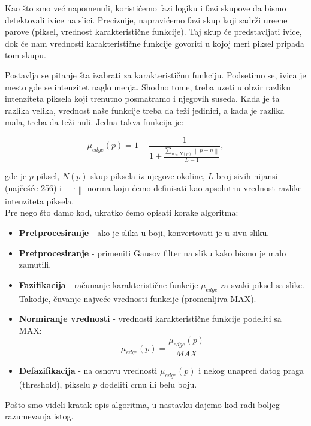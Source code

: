 \documentclass[12pt,a4paper]{article}
\theoremstyle{definition}
\theoremstyle{remark}
\theoremstyle{plain}
\begin{document}
Kao \v sto smo ve\' c napomenuli, koristi\' cemo fazi logiku i fazi skupove da bismo detektovali ivice na slici. Preciznije, napravi\' cemo fazi skup koji sadr\v zi ure\dj ene parove (piksel, vrednost karakteristi\v cne funkcije). Taj skup \' ce predstavljati ivice, dok \' ce nam vrednosti karakteristi\v cne funkcije govoriti u kojoj meri piksel pripada tom skupu.

Postavlja se pitanje \v sta izabrati za karakteristi\v cnu funkciju. Podsetimo se, ivica je mesto gde se intenzitet naglo menja. Shodno tome, treba uzeti u obzir razliku intenziteta piksela koji trenutno posmatramo i njegovih suseda. Kada je ta razlika velika, vrednost na\v se funkcije treba da te\v zi jedinici, a kada je razlika mala, treba da te\v zi nuli. Jedna takva funkcija je:

\begin{equation}
  \mu_{edge}(p) = 1 - \frac{1}{1+\frac{\sum_{n\in N(p)}\left\|p-n\right\|}{L-1}},
\end{equation}

gde je $p$ piksel, $N(p)$ skup piksela iz njegove okoline, $L$ broj sivih nijansi (naj\v ce\v s\' ce 256) i $\left\| \cdot \right\|$ norma koju \' cemo definisati kao apsolutnu vrednost razlike intenziteta piksela.\\

Pre nego \v sto damo kod, ukratko \' cemo opisati korake algoritma:
\begin{itemize}
  \item \textbf{Pretprocesiranje} - ako je slika u boji, konvertovati je u sivu sliku.
  \item \textbf{Pretprocesiranje} - primeniti Gausov filter na sliku kako bismo je malo zamutili.
  \item \textbf{Fazifikacija} - ra\v cunanje karakteristi\v cne funkcije $\mu_{edge}$ za svaki piksel sa slike. Takodje, \v cuvanje najve\' ce vrednosti funkcije (promenljiva MAX).
  \item \textbf{Normiranje vrednosti} - vrednosti karakteristi\v cne funkcije podeliti sa MAX:
    \begin{equation*}
      \mu_{edge}(p) = \frac{\mu_{edge}(p)}{MAX}
    \end{equation*}
  \item \textbf{Defazifikacija} - na osnovu vrednosti $\mu_{edge}(p)$ i nekog unapred datog praga (threshold), pikselu $p$ dodeliti crnu ili belu boju.
\end{itemize}

Po\v sto smo videli kratak opis algoritma, u nastavku dajemo kod radi boljeg razumevanja istog.
\end{document}
